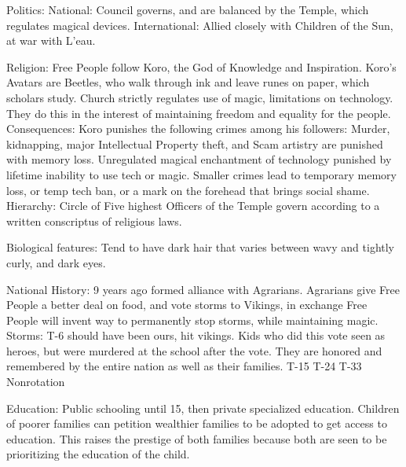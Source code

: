 \documentclass[blue]{GL2020}
\begin{document}
Politics:
	National: Council governs, and are balanced by the Temple, which regulates magical devices.
	International:  Allied closely with Children of the Sun, at war with L'eau.
	
Religion:		Free People follow Koro, the God of Knowledge and Inspiration.  Koro's Avatars are Beetles, who walk through ink and leave runes on paper, which scholars study.  Church strictly regulates use of
						magic, limitations on technology.  They do this in the interest of maintaining freedom and 
						equality for the people.  
	Consequences:  Koro punishes the following crimes among his followers:  Murder, kidnapping, major 
						Intellectual Property theft, and Scam artistry are punished with memory loss.  Unregulated 
						magical enchantment of technology punished by lifetime inability to use tech or magic.  
						Smaller crimes lead to temporary memory loss, or temp tech ban, or a mark on the forehead 
						that brings social shame.
	Hierarchy:  Circle of Five highest Officers of the Temple govern according to a written conscriptus of
						religious laws.
	
	
Biological features:	Tend to have dark hair that varies between wavy and tightly curly, and dark eyes.

National History:		9 years ago formed alliance with Agrarians.  Agrarians give Free People a better deal on food, and vote storms to Vikings, in exchange Free People will invent way to permanently stop storms, while maintaining magic.  %
	Storms:		T-6 should have been ours, hit vikings.  Kids who did this vote seen as heroes, but were murdered at the school after the vote.  They are honored and remembered by the entire nation as well as their families. %
						T-15
						T-24
						T-33
						Nonrotation
	
Education:	Public schooling until 15, then private specialized education.  Children of poorer families can petition wealthier families to be adopted to get access to education. This raises the prestige of both families because both are seen to be prioritizing the education of the child.
\end{document}
